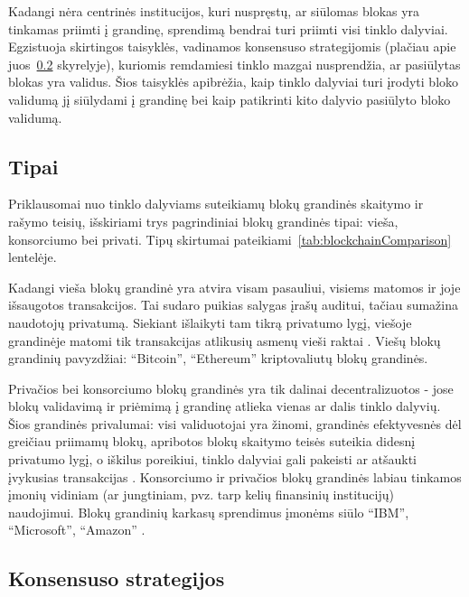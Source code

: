 Kadangi nėra centrinės institucijos, kuri nuspręstų, ar siūlomas blokas yra tinkamas priimti į grandinę, sprendimą bendrai turi priimti
visi tinklo dalyviai. Egzistuoja skirtingos taisyklės, vadinamos konsensuso strategijomis (plačiau apie juos\hypertarget{blockchain:consensus}{~\ref{blockchain:consensus}} skyrelyje), kuriomis
remdamiesi tinklo mazgai nusprendžia, ar pasiūlytas blokas yra validus. Šios taisyklės apibrėžia, kaip tinklo dalyviai turi įrodyti bloko validumą jį siūlydami į grandinę
bei kaip patikrinti kito dalyvio pasiūlyto bloko validumą.

\subsection{Tipai}

Priklausomai nuo tinklo dalyviams suteikiamų blokų grandinės skaitymo ir rašymo teisių,
išskiriami trys pagrindiniai blokų grandinės tipai: vieša, konsorciumo bei privati.  Tipų skirtumai pateikiami\hypertarget{tab:blockchainComparison}{~\ref{tab:blockchainComparison}} lentelėje.



Kadangi vieša blokų grandinė yra atvira visam pasauliui, visiems matomos ir joje išsaugotos transakcijos. Tai sudaro puikias salygas įrašų
auditui, tačiau sumažina naudotojų privatumą. Siekiant išlaikyti tam tikrą privatumo lygį, viešoje grandinėje matomi tik transakcijas atlikusių 
asmenų vieši raktai \cite{SatoshiNakamoto}. Viešų blokų grandinių pavyzdžiai: \enquote{Bitcoin}, \enquote{Ethereum} kriptovaliutų blokų grandinės.

Privačios bei konsorciumo blokų grandinės yra tik dalinai decentralizuotos - jose blokų validavimą ir priėmimą į grandinę atlieka vienas
ar dalis tinklo dalyvių. Šios grandinės privalumai: visi validuotojai yra žinomi, grandinės efektyvesnės dėl greičiau priimamų blokų, apribotos blokų skaitymo teisės suteikia didesnį
privatumo lygį, o iškilus poreikiui, tinklo dalyviai gali pakeisti ar atšaukti įvykusias transakcijas \cite{Buterin2015}. Konsorciumo ir privačios blokų grandinės labiau tinkamos įmonių vidiniam (ar jungtiniam,
pvz. tarp kelių finansinių institucijų) naudojimui. Blokų grandinių karkasų sprendimus įmonėms siūlo \enquote{IBM}, \enquote{Microsoft}, \enquote{Amazon} \cite{Zheng2017}.

\subsection{Konsensuso strategijos} \label{blockchain:consensus}

